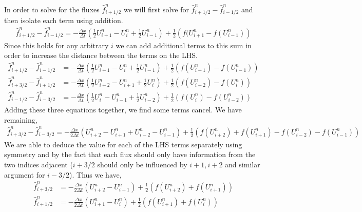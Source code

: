 \documentclass{article}
\begin{document}
\begin{enumerate}[label = (\alph*)]
    In order to solve for the fluxes $\hat{f}_{i+1/2}^n$ we will first solve for
    $\hat{f}_{i+1/2}^n - \hat{f}_{i-1/2}^n$ and then isolate each term using
    addition. 
    \begin{gather*}
        \hat{f}_{i+1/2}^n - \hat{f}_{i-1/2}^n = -\frac{\Delta x}{\Delta
        t}\left(\frac{1}{2}U_{i+1}^n - U_{i}^n + \frac{1}{2}U_{i-1}^n\right) +
        \frac{1}{2}\left(f(U_{i+1}^n - f(U_{i-1}^n)\right)
    \end{gather*}
    Since this holds for any arbitrary $i$ we can add additional terms to this
    sum in order to increase the distance between the terms on the LHS. 
    \begin{align*}
        \hat{f}_{i+1/2}^n - \hat{f}_{i-1/2}^n &= -\frac{\Delta x}{\Delta
        t}\left(\frac{1}{2}U_{i+1}^n - U_{i}^n + \frac{1}{2}U_{i-1}^n\right) +
        \frac{1}{2}\left(f(U_{i+1}^n) - f(U_{i-1}^n)\right)\\
        \hat{f}_{i+3/2}^n - \hat{f}_{i+1/2}^n &= -\frac{\Delta x}{\Delta
        t}\left(\frac{1}{2}U_{i+2}^n - U_{i+1}^n + \frac{1}{2}U_{i}^n\right) +
        \frac{1}{2}\left(f(U_{i+2}^n) - f(U_{i}^n)\right)\\
        \hat{f}_{i-1/2}^n - \hat{f}_{i-3/2}^n &= -\frac{\Delta x}{\Delta
        t}\left(\frac{1}{2}U_{i}^n - U_{i-1}^n + \frac{1}{2}U_{i-2}^n\right) +
        \frac{1}{2}\left(f(U_{i}^n) - f(U_{i-2}^n)\right)
    \end{align*}
    Adding these three equations together, we find some terms cancel. We have
    remaining, 
    \begin{gather*}
        \hat{f}_{i+3/2}^n - \hat{f}_{i-3/2}^n = -\frac{\Delta x}{2\Delta
        t}\left(U_{i+2}^n - U_{i+1}^n +
        U_{i-2}^n - U_{i-1}^n\right) +
        \frac{1}{2}\left(f(U_{i+2}^n) + f(U_{i+1}^n) - f(U_{i-2}^n) - f(U_{i-1}^n)\right)
    \end{gather*}
    We are able to deduce the value for each of the LHS terms separately using
    symmetry and by the fact that each flux should only have information from
    the two indices adjacent ($i + 3/2$ should only be influenced by $i + 1,
    i+2$ and similar argument for $i-3/2$). Thus we have,
    \begin{align*}
        \hat{f}_{i+3/2}^n &= -\frac{\Delta x}{2\Delta
        t}\left(U_{i+2}^n - U_{i+1}^n\right) + 
        \frac{1}{2}\left(f(U_{i+2}^n) + f(U_{i+1}^n)\right)\\
        \hat{f}_{i+1/2}^n &= -\frac{\Delta x}{2\Delta
        t}\left(U_{i+1}^n - U_{i}^n\right) + 
        \frac{1}{2}\left(f(U_{i+1}^n) + f(U_{i}^n)\right)
    \end{align*}



\end{enumerate}
\end{document}
